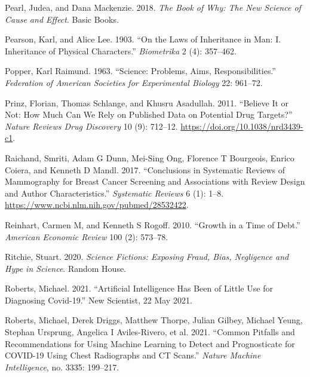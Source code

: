 \documentclass[
  10pt,
  b5paper]{book}
\newlength{\cslhangindent}
\newlength{\cslentryspacingunit} %
\newenvironment{CSLReferences}[2] %
 {%
  \setlength{\parindent}{0pt}
  \ifodd #1
  \let\oldpar\par
  \def\par{\hangindent=\cslhangindent\oldpar}
  \fi
  \setlength{\parskip}{#2\cslentryspacingunit}
 }%
 {}
\begin{document}
\begin{CSLReferences}{1}{0}
\leavevmode{}%
Pearl, Judea, and Dana Mackenzie. 2018. \emph{The Book of Why: The New Science of Cause and Effect}. Basic Books.

\leavevmode{}%
Pearson, Karl, and Alice Lee. 1903. {``On the Laws of Inheritance in Man: I. Inheritance of Physical Characters.''} \emph{Biometrika} 2 (4): 357--462.

\leavevmode{}%
Popper, Karl Raimund. 1963. {``Science: Problems, Aims, Responsibilities.''} \emph{Federation of American Societies for Experimental Biology} 22: 961--72.

\leavevmode{}%
Prinz, Florian, Thomas Schlange, and Khusru Asadullah. 2011. {``Believe It or Not: How Much Can We Rely on Published Data on Potential Drug Targets?''} \emph{Nature Reviews Drug Discovery} 10 (9): 712--12. \url{https://doi.org/10.1038/nrd3439-c1}.

\leavevmode{}%
Raichand, Smriti, Adam G Dunn, Mei-Sing Ong, Florence T Bourgeois, Enrico Coiera, and Kenneth D Mandl. 2017. {``Conclusions in Systematic Reviews of Mammography for Breast Cancer Screening and Associations with Review Design and Author Characteristics.''} \emph{Systematic Reviews} 6 (1): 1--8. \url{https://www.ncbi.nlm.nih.gov/pubmed/28532422}.

\leavevmode{}%
Reinhart, Carmen M, and Kenneth S Rogoff. 2010. {``Growth in a Time of Debt.''} \emph{American Economic Review} 100 (2): 573--78.

\leavevmode{}%
Ritchie, Stuart. 2020. \emph{Science Fictions: Exposing Fraud, Bias, Negligence and Hype in Science}. Random House.

\leavevmode{}%
Roberts, Michael. 2021. {``Artificial Intelligence Has Been of Little Use for Diagnosing Covid-19.''} New Scientist, 22 May 2021.

\leavevmode{}%
Roberts, Michael, Derek Driggs, Matthew Thorpe, Julian Gilbey, Michael Yeung, Stephan Ursprung, Angelica I Aviles-Rivero, et al. 2021. {``Common Pitfalls and Recommendations for Using Machine Learning to Detect and Prognosticate for COVID-19 Using Chest Radiographs and CT Scans.''} \emph{Nature Machine Intelligence}, no. 3335: 199--217.


\end{CSLReferences}
\end{document}
